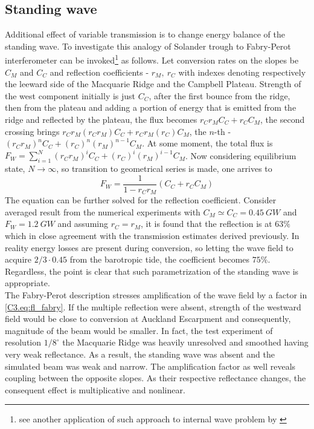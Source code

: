 \documentclass[12pt]{article}
\begin{document}
\subsection{Standing wave}
\label{C3.sec:disc_sw}
Additional effect of variable transmission is to change energy balance of the standing wave. To 
investigate this analogy of Solander trough to Fabry-Perot interferometer can be 
invoked\footnote{see another application of such approach to internal wave problem by 
\cite{mathur2010internal}} as follows. Let conversion rates on the slopes be 
$C_M$ and $C_C$ and reflection coefficients - $r_M,~r_C$ with indexes denoting respectively the leeward 
side of the Macquarie Ridge and the Campbell Plateau. Strength of the west component initially is 
just $C_C$, after the first bounce from the ridge, then from the plateau and adding a portion of 
energy that is emitted from the ridge and reflected by the plateau, the flux becomes $r_C r_M C_C 
+ r_C C_M$, the second crossing brings $r_C r_M (r_C r_M) C_C + r_C r_M (r_C) C_M$, the $n$-th 
- $(r_C r_M)^n C_C + (r_C)^n (r_M)^{n-1} C_M$. At some moment, the total flux is $F_W = 
\sum_{i = 1}^N (r_C r_M)^i C_C + (r_C)^i (r_M)^{i-1} C_M$. Now considering equilibrium state, $N 
\rightarrow \infty$, so transition to geometrical series is made, one arrives to
\begin{equation}
\label{C3.eq:fl_fabry}
F_W = \frac{1}{1 - r_C r_M} (C_C + r_C C_M)
\end{equation}
The equation can be further solved for the reflection coefficient. Consider averaged result 
from the numerical experiments  with $C_M \simeq C_C = 0.45~GW$ and 
$F_W = 1.2~GW$ and assuming $r_C = r_M$, it is found that the reflection is at $63\%$ which in 
close agreement with the transmission estimates derived previously. In reality energy losses are 
present during conversion, so letting the wave field to acquire $2/3 \cdot 0.45$ 
from the barotropic tide, the coefficient becomes $75\%$. Regardless, the point is 
clear that such parametrization of the standing wave is appropriate.\\

The Fabry-Perot description stresses amplification of the wave field by a factor in 
\eqref{C3.eq:fl_fabry}. If the multiple reflection were absent, strength of the westward field would be    
close to conversion at Auckland Escarpment and consequently, magnitude of the beam would be smaller. In fact, 
the test experiment of resolution $1/8^{\circ}$ the Macquarie Ridge was heavily unresolved and 
smoothed having very weak reflectance. As a result, the standing wave was absent and the simulated 
beam was weak and narrow. The amplification factor as well reveals coupling between the opposite 
slopes. As their respective reflectance changes, the consequent effect is multiplicative and nonlinear.\\
\end{document}
